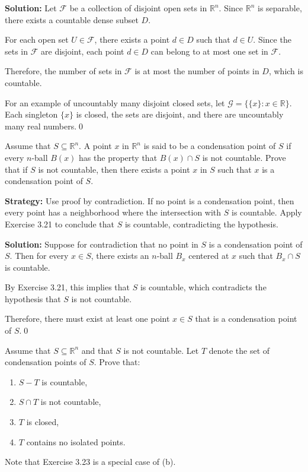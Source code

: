 \bigskip\noindent\textbf{Solution:} Let $\mathcal{F}$ be a collection of disjoint open sets in $\mathbb{R}^n$. Since $\mathbb{R}^n$ is separable, there exists a countable dense subset $D$.

For each open set $U \in \mathcal{F}$, there exists a point $d \in D$ such that $d \in U$. Since the sets in $\mathcal{F}$ are disjoint, each point $d \in D$ can belong to at most one set in $\mathcal{F}$.

Therefore, the number of sets in $\mathcal{F}$ is at most the number of points in $D$, which is countable.

For an example of uncountably many disjoint closed sets, let $\mathcal{G} = \{\{x\} : x \in \mathbb{R}\}$. Each singleton $\{x\}$ is closed, the sets are disjoint, and there are uncountably many real numbers.\qed


\begin{problembox}
Assume that \( S \subseteq \mathbb{R}^n \). A point \( x \) in \( \mathbb{R}^n \) is said to be a condensation point of \( S \) if every \( n \)-ball \( B(x) \) has the property that \( B(x) \cap S \) is not countable. Prove that if \( S \) is not countable, then there exists a point \( x \) in \( S \) such that \( x \) is a condensation point of \( S \).
\end{problembox}

\noindent\textbf{Strategy:} Use proof by contradiction. If no point is a condensation point, then every point has a neighborhood where the intersection with $S$ is countable. Apply Exercise 3.21 to conclude that $S$ is countable, contradicting the hypothesis.

\bigskip\noindent\textbf{Solution:} Suppose for contradiction that no point in $S$ is a condensation point of $S$. Then for every $x \in S$, there exists an $n$-ball $B_x$ centered at $x$ such that $B_x \cap S$ is countable.

By Exercise 3.21, this implies that $S$ is countable, which contradicts the hypothesis that $S$ is not countable.

Therefore, there must exist at least one point $x \in S$ that is a condensation point of $S$.\qed


\begin{problembox}
Assume that \( S \subseteq \mathbb{R}^n \) and that \( S \) is not countable. Let \( T \) denote the set of condensation points of \( S \). Prove that:
\begin{enumerate}[label=\alph*)]
\item \( S - T \) is countable,
\item \( S \cap T \) is not countable,
\item \( T \) is closed,
\item \( T \) contains no isolated points.
\end{enumerate}
Note that Exercise 3.23 is a special case of (b).
\end{problembox}

